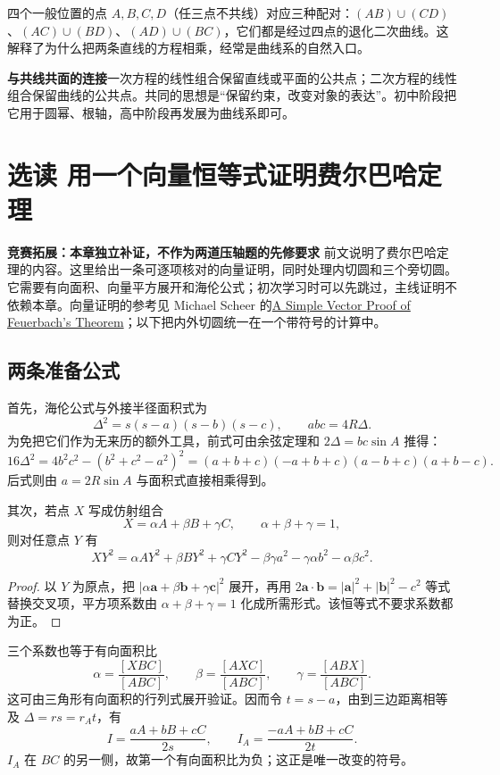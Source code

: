 \documentclass[lang=cn,12pt,fontset=none,a4paper,openany]{beautybook}
\newcommand{\level}[1]{\par\smallskip\noindent\textcolor{coverfgcolor}{\textbf{#1}}\quad}
\begin{document}
四个一般位置的点 $A,B,C,D$（任三点不共线）对应三种配对：$(AB)\cup(CD)$、$(AC)\cup(BD)$、$(AD)\cup(BC)$，它们都是经过四点的退化二次曲线。这解释了为什么把两条直线的方程相乘，经常是曲线系的自然入口。

\level{与共线共面的连接}一次方程的线性组合保留直线或平面的公共点；二次方程的线性组合保留曲线的公共点。共同的思想是“保留约束，改变对象的表达”。初中阶段把它用于圆幂、根轴，高中阶段再发展为曲线系即可。

\chapter{选读 用一个向量恒等式证明费尔巴哈定理}
\level{竞赛拓展：本章独立补证，不作为两道压轴题的先修要求}
前文说明了费尔巴哈定理的内容。这里给出一条可逐项核对的向量证明，同时处理内切圆和三个旁切圆。它需要有向面积、向量平方展开和海伦公式；初次学习时可以先跳过，主线证明不依赖本章。向量证明的参考见 Michael Scheer 的\href{https://arxiv.org/abs/1107.1152}{A Simple Vector Proof of Feuerbach's Theorem}；以下把内外切圆统一在一个带符号的计算中。

\section{两条准备公式}
首先，海伦公式与外接半径面积式为
\[
 \Delta^2=s(s-a)(s-b)(s-c),\qquad abc=4R\Delta.
\]
为免把它们作为无来历的额外工具，前式可由余弦定理和 $2\Delta=bc\sin A$ 推得：
\[
 16\Delta^2=4b^2c^2-(b^2+c^2-a^2)^2
 =(a+b+c)(-a+b+c)(a-b+c)(a+b-c).
\]
后式则由 $a=2R\sin A$ 与面积式直接相乘得到。

其次，若点 $X$ 写成仿射组合
\[
 X=\alpha A+\beta B+\gamma C,\qquad \alpha+\beta+\gamma=1,
\]
则对任意点 $Y$ 有
\begin{equation}\label{eq:weighted-distance-feuerbach}
 XY^2=\alpha AY^2+\beta BY^2+\gamma CY^2
 -\beta\gamma a^2-\gamma\alpha b^2-\alpha\beta c^2.
\end{equation}
\begin{proof}
以 $Y$ 为原点，把 $|\alpha\mathbf a+\beta\mathbf b+\gamma\mathbf c|^2$ 展开，再用
$2\mathbf a\cdot\mathbf b=|\mathbf a|^2+|\mathbf b|^2-c^2$ 等式替换交叉项，平方项系数由 $\alpha+\beta+\gamma=1$ 化成所需形式。该恒等式不要求系数都为正。
\end{proof}
三个系数也等于有向面积比
\[
 \alpha=\frac{[XBC]}{[ABC]},\qquad
 \beta=\frac{[AXC]}{[ABC]},\qquad
 \gamma=\frac{[ABX]}{[ABC]}.
\]
这可由三角形有向面积的行列式展开验证。因而令 $t=s-a$，由到三边距离相等及 $\Delta=rs=r_At$，有
\[
 I=\frac{aA+bB+cC}{2s},\qquad
 I_A=\frac{-aA+bB+cC}{2t}.
\]
$I_A$ 在 $BC$ 的另一侧，故第一个有向面积比为负；这正是唯一改变的符号。
\end{document}
